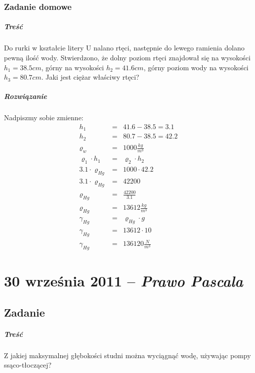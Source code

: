\documentclass [a4paper, 11pt, oneside]{book}
\begin{document}
	\subsection{Zadanie domowe} %
	\label{sub:zadanie_domowe}
		\paragraph{Treść} Do rurki w kształcie litery U nalano rtęci, następnie do lewego ramienia dolano pewną ilość wody. Stwierdzono, że dolny poziom rtęci znajdował się na wysokości $h_1 = 38.5 cm$, górny na wysokości $h_2 = 41.6 cm$, górny poziom wody na wysokości $h_3 = 80.7 cm$. Jaki jest ciężar właściwy rtęci?
		\paragraph{Rozwiązanie} Nadpiszmy sobie zmienne:
		\begin{eqnarray*}
			h_1 &=& 41.6-38.5 = 3.1\\
			h_2 &=& 80.7 - 38.5 = 42.2\\
			\varrho_w &=& 1000\frac{kg}{m^3}\\
			\varrho_1\cdot h_1 &=& \varrho_2\cdot h_2\\
			3.1\cdot \varrho_{Hg} &=& 1000\cdot 42.2\\
			3.1\cdot\varrho_{Hg} &=& 42200\\
			\varrho_{Hg} &=& \frac{42200}{3.1}\\
			\varrho_{Hg} &=& 13612\frac{kg}{m^3}\\
			\gamma_{Hg} &=& \varrho_{Hg}\cdot g\\
			\gamma_{Hg} &=& 13612\cdot10\\
			\gamma_{Hg} &=& 136120\frac{N}{m^3}
		\end{eqnarray*}
\chapter{30 września 2011 -- \textit{Prawo Pascala}} %
\label{cha:30_wrze_nia_2011_textit}
	\section*{Zadanie} %
	\label{sec:zadanie}
		\paragraph{Treść}Z jakiej maksymalnej głębokości studni można wyciągnąć wodę, używając pompy ssąco-tłoczącej?
\end{document}
